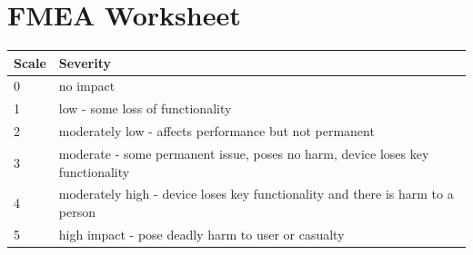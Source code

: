 \documentclass{article}
\begin{document}
\newpage    
\section{FMEA Worksheet}

\begin{table}[!ht]
    \centering
    \begin{tabular}{|l|l|}
    \hline
        Scale & Severity \\ \hline
        0 & no impact  \\ \hline
        1 & low - some loss of functionality \\ \hline
        2 & moderately low - affects performance but not permanent \\ \hline
        3 & moderate - some permanent issue, poses no harm, device loses key functionality  \\ \hline
        4 & moderately high - device loses key functionality and there is harm to a person  \\ \hline
        5 & high impact - pose deadly harm to user or casualty  \\ \hline
    \end{tabular}
\end{table}
\end{document}
